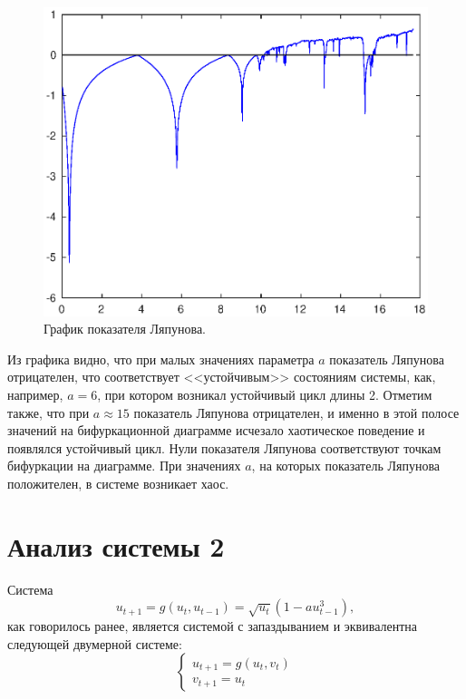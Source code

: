 \documentclass[16pt]{article}
\begin{document}
\begin{figure}[h]
\begin{center}
\includegraphics[width=150mm]{lyap.eps}
\caption{График показателя Ляпунова.}
\end{center}
\end{figure}

Из графика видно, что при малых значениях параметра $a$ показатель Ляпунова отрицателен, что соответствует
<<устойчивым>> состояниям системы, как, например, $a = 6$, при котором возникал устойчивый цикл длины 2.
Отметим также, что при $a \approx 15$ показатель Ляпунова отрицателен, и именно в этой полосе значений
на бифуркационной диаграмме исчезало хаотическое поведение и появлялся устойчивый цикл. Нули показателя Ляпунова соответствуют точкам
бифуркации на диаграмме. При значениях $a$, на которых показатель Ляпунова положителен,
в системе возникает хаос.

\newpage
\section{Анализ системы 2}

Система
$$u_{t+1} = g(u_t, u_{t-1}) = \sqrt{u_t}(1 - au_{t-1}^3),$$
как говорилось ранее, является системой с запаздыванием и эквивалентна следующей двумерной системе:
\begin{equation} \label{2dsys}
\begin{cases}
u_{t+1} = g(u_t, v_t)\\
v_{t+1} = u_t
\end{cases}
\end{equation}
\end{document}
